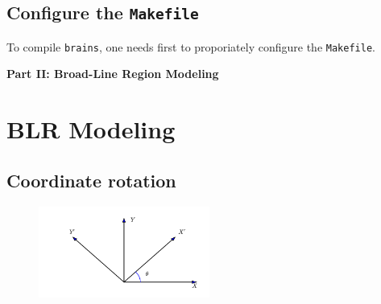 \documentclass[oneside]{book}
\def\brains{{\texttt{brains}}}
\begin{document}
\section{Configure the \texttt{Makefile}}
To compile {\brains}, one needs first to proporiately configure the \texttt{Makefile}.

\clearpage
\newpage

\vspace*{10cm}
{\Huge\centerline{\bf Part II: Broad-Line Region Modeling}}

\setcounter{chapter}{0}
\chapter{BLR Modeling}

\section{Coordinate rotation}
\begin{figure}[h!]
\centering
\includegraphics[width=0.5\textwidth]{coord.pdf}
\end{figure}
\end{document}
